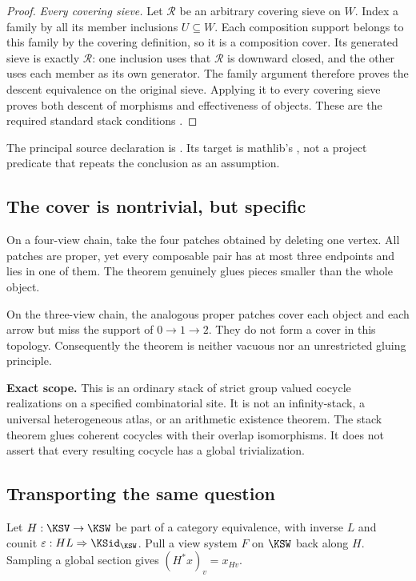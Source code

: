 \begin{proof}
\emph{Every covering sieve.} Let $\mathcal R$ be an arbitrary covering sieve on $W$. Index a family by all its member inclusions $U\subseteq W$. Each composition support belongs to this family by the covering definition, so it is a composition cover. Its generated sieve is exactly $\mathcal R$: one inclusion uses that $\mathcal R$ is downward closed, and the other uses each member as its own generator. The family argument therefore proves the descent equivalence on the original sieve. Applying it to every covering sieve proves both descent of morphisms and effectiveness of objects. These are the required standard stack conditions \cite{KS:stacks-stack,KS:mathlib-stack}.
\end{proof}
The principal source declaration is . Its target is mathlib's , not a project predicate that repeats the conclusion as an assumption.

\subsection{The cover is nontrivial, but specific}
On a four-view chain, take the four patches obtained by deleting one vertex. All patches are proper, yet every composable pair has at most three endpoints and lies in one of them. The theorem genuinely glues pieces smaller than the whole object.

On the three-view chain, the analogous proper patches cover each object and each arrow but miss the support of \(0\to1\to2\). They do not form a cover in this topology. Consequently the theorem is neither vacuous nor an unrestricted gluing principle.

\begin{scopebox}
\textbf{Exact scope.} This is an ordinary stack of strict group valued cocycle realizations on a specified combinatorial site. It is not an infinity-stack, a universal heterogeneous atlas, or an arithmetic existence theorem. The stack theorem glues coherent cocycles with their overlap isomorphisms. It does not assert that every resulting cocycle has a global trivialization.
\end{scopebox}

\label{KS:sec:relative}
\subsection{Transporting the same question}
Let \(H:\KSV\to\KSW\) be part of a category equivalence, with inverse \(L\) and counit \(\varepsilon:HL\Rightarrow\KSid_\KSW\). Pull a view system \(F\) on \(\KSW\) back along \(H\). Sampling a global section gives \((H^*x)_v=x_{Hv}\).

